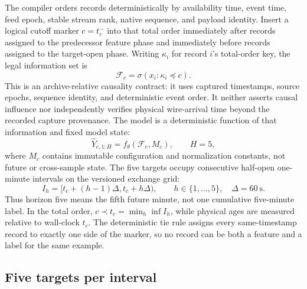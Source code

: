 \documentclass[10pt,letterpaper]{article}
\numberwithin{equation}{section}
\theoremstyle{definition}
\theoremstyle{remark}
\begin{document}
The compiler orders records deterministically by availability time, event time,
feed epoch, stable stream rank, native sequence, and payload identity. Insert a
logical cutoff marker \(c=t_c^{-}\) into that total order immediately after
records assigned to the predecessor feature phase and immediately before
records assigned to the target-open phase. Writing \(\kappa_i\) for record
\(i\)'s total-order key, the legal information set is
\begin{equation}
\mathcal F_c=\sigma\!\left(x_i:\kappa_i\preceq c\right).
\label{eq:information-set}
\end{equation}
This is an archive-relative causality contract: it uses captured timestamps,
source epochs, sequence identity, and deterministic event order. It neither
asserts causal influence nor independently verifies physical wire-arrival time
beyond the recorded capture provenance.
The model is a deterministic function of that information and fixed model
state:
\begin{equation}
\widehat{Y}_{c,1:H}=f_\theta(\mathcal F_c,M_c),\qquad H=5,
\label{eq:forecast-map}
\end{equation}
where $M_c$ contains immutable configuration and normalization constants, not
future or cross-sample state. The five targets occupy consecutive half-open
one-minute intervals on the versioned exchange grid:
\begin{equation}
I_h=[t_c+(h-1)\Delta,t_c+h\Delta),\qquad
h\in\{1,\ldots,5\},\quad \Delta=60\ \mathrm{s}.
\label{eq:intervals}
\end{equation}
Thus horizon five means the fifth future minute, not one cumulative five-minute
label. In the total order, \(c\prec t_c=\min_h\inf I_h\), while physical ages
are measured relative to wall-clock \(t_c\). The deterministic tie rule assigns
every same-timestamp record to exactly one side of the marker, so no record can
be both a feature and a label for the same example.

\subsection{Five targets per interval}
\end{document}
